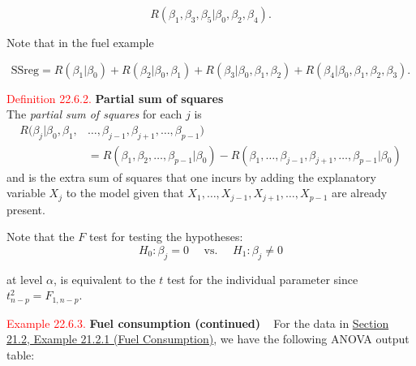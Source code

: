 \documentclass[
]{book}
\begin{document}
\[R(\beta_1,\beta_3,\beta_5 | \beta_0,\beta_2,\beta_4).\]

Note that in the fuel example

\[ \text{SSreg} = R(\beta_1 | \beta_0) + R(\beta_2 | \beta_0,\beta_1) + R(\beta_3 | \beta_0,\beta_1,\beta_2) + R(\beta_4 | \beta_0,\beta_1,\beta_2,\beta_3).\]

\leavevmode{}%
\textcolor{red}{Definition 22.6.2.}
{\textbf{Partial sum of squares}}\\
The \emph{partial sum of squares} for each \(j\) is
\begin{align*}
R(\beta_j | \beta_0,\beta_1,&\dots,\beta_{j-1},\beta_{j+1},\dots,\beta_{p-1}) \\
&=  R(\beta_1,\beta_2,\dots,\beta_{p-1} | \beta_0) - R(\beta_1,\dots,\beta_{j-1},\beta_{j+1},\dots,\beta_{p-1} | \beta_0)
\end{align*}
and is the extra sum of squares that one incurs by adding the explanatory variable \(X_j\) to the model given that \(X_1,\dots,X_{j-1},X_{j+1},\dots,X_{p-1}\) are already present.

Note that the \(F\) test for testing the hypotheses:\\

\[ H_0: \beta_j = 0 \quad \text{ vs. } \quad H_1: \beta_j \neq 0 \]

at level \(\alpha\), is equivalent to the \(t\) test for the individual parameter since \(t_{n-p}^2 = F_{1,n-p}\).

\leavevmode{}%
\textcolor{red}{Example 22.6.3.}
{\textbf{Fuel consumption (continued)}}
~
For the data in \protect\hyperlink{Sec_Linear_hypo_test:single}{Section 21.2, Example 21.2.1 (Fuel Consumption)}, we have the following ANOVA output table:
\end{document}

